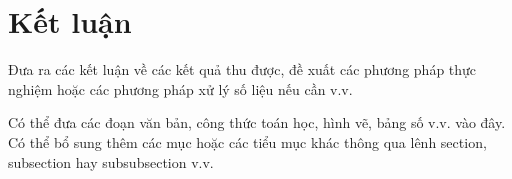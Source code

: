 \chapter*{Kết luận}
\label{ch:ketluan}

Đưa ra các kết luận về các kết quả thu được, đề xuất các phương pháp thực nghiệm hoặc các phương pháp xử lý số liệu nếu cần v.v.

Có thể đưa các đoạn văn bản, công thức toán học, hình vẽ, bảng số v.v. vào đây. Có thể bổ sung thêm các mục hoặc các tiểu mục khác thông qua lênh section, subsection hay subsubsection v.v.